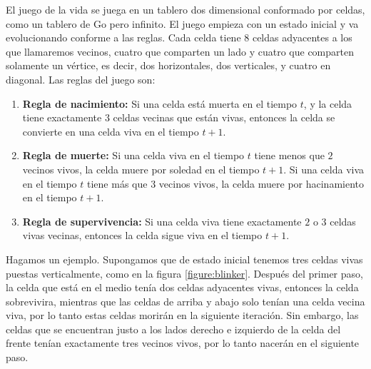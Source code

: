 El juego de la vida se juega en un tablero dos dimensional conformado por celdas, como un tablero de Go pero infinito. El juego empieza con un estado inicial y va evolucionando conforme a las reglas. Cada celda tiene 8 celdas adyacentes a los que llamaremos vecinos, cuatro que comparten un lado y cuatro que comparten solamente un v\'ertice, es decir, dos horizontales, dos verticales, y cuatro en diagonal. Las reglas del juego son:

\begin{enumerate}
    \item \textbf{Regla de nacimiento:} Si una celda est\'a muerta en el tiempo $t$, y la celda tiene exactamente $3$ celdas vecinas que est\'an vivas, entonces la celda se convierte en una celda viva en el tiempo $t+1$.
    \item \textbf{Regla de muerte:} Si una celda viva en el tiempo $t$ tiene menos que $2$ vecinos vivos, la celda muere por soledad en el tiempo $t+1$. Si una celda viva en el tiempo $t$ tiene m\'as que $3$ vecinos vivos, la celda muere por hacinamiento en el tiempo $t+1$.
    \item \textbf{Regla de supervivencia:} Si una celda viva tiene exactamente $2$ o $3$ celdas vivas vecinas, entonces la celda sigue viva en el tiempo $t+1$.
\end{enumerate}

Hagamos un ejemplo. Supongamos que de estado inicial tenemos tres celdas vivas puestas verticalmente, como en la figura \ref{figure:blinker}. Despu\'es del primer paso, la celda que est\'a en el medio ten\'ia dos celdas adyacentes vivas, entonces la celda sobrevivira, mientras que las celdas de arriba y abajo solo ten\'ian una celda vecina viva, por lo tanto estas celdas morir\'an en la siguiente iteraci\'on. Sin embargo, las celdas que se encuentran justo a los lados derecho e izquierdo de la celda del frente ten\'ian exactamente tres vecinos vivos, por lo tanto nacer\'an en el siguiente paso.

